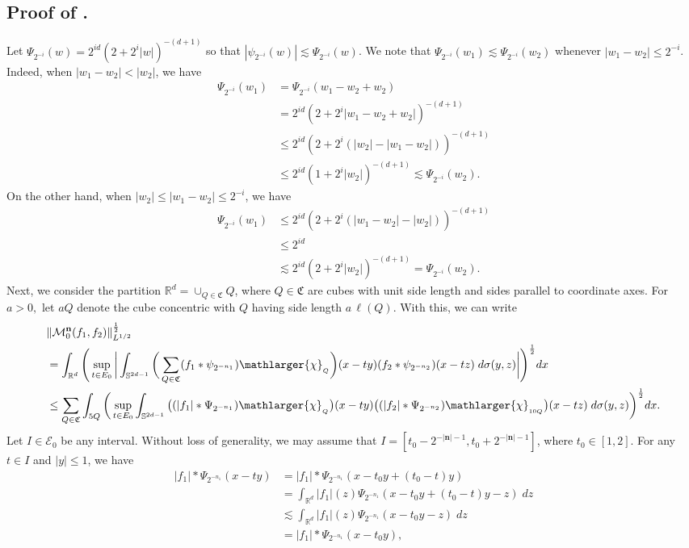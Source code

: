 \documentclass[a4paper,reqno]{amsart}
\numberwithin{equation}{section}
\newcommand{\R}{{\mathbb {R}}}
\begin{document}
	\subsection{Proof of .}
	Let $\Psi_{2^{-i}}(w)=2^{id}(2+2^i|w|)^{-(d+1)}$ so that $|\psi_{2^{-i}}(w)|\lesssim\Psi_{2^{-i}}(w)$. We note that $\Psi_{2^{-i}}(w_1)\lesssim\Psi_{2^{-i}}(w_2)$ whenever $|w_1-w_2|\leq2^{-i}$. Indeed, when $|w_1-w_2|<|w_2|$, we have
	\begin{align*}
		\Psi_{2^{-i}}(w_1)&=\Psi_{2^{-i}}(w_1-w_2+w_2)\\
		&=2^{id}(2+2^{i}|w_1-w_2+w_2|)^{-(d+1)}\\
		&\leq 2^{id}(2+2^{i}(|w_2|-|w_1-w_2|))^{-(d+1)}\\
		&\leq 2^{id}(1+2^{i}|w_2|)^{-(d+1)}\lesssim \Psi_{2^{-i}}(w_2).
	\end{align*}
	On the other hand, when $|w_2|\leq|w_1-w_2|\leq2^{-i}$, we have
	\begin{align*}
		\Psi_{2^{-i}}(w_1)&\leq 2^{id}(2+2^{i}(|w_1-w_2|-|w_2|))^{-(d+1)}\\
		&\leq 2^{id}\\
		&\lesssim 2^{id}(2+2^{i}|w_2|)^{-(d+1)}= \Psi_{2^{-i}}(w_2).
	\end{align*}
	Next, we consider the partition $\R^d=\cup_{Q\in\mathfrak C}Q$, where $Q\in\mathfrak{C}$ are cubes with unit side length and sides parallel to coordinate axes. For $a>0,$ let $aQ$ denote the cube concentric with $Q$ having side length $a\,\ell(Q)$. With this, we can write 
	\begin{align*}
		&\|\mathcal{M}^{\mathbf{n}}_0(f_1,f_2)\|_{L^{1/2}}^\frac{1}{2}\\	
		&=\int_{\R^d}\Bigg(\sup\limits_{t\in E_0}\bigg|\int_{\mathbb{S}^{2d-1}}\bigg(\sum\limits_{Q\in\mathfrak{C}}(f_1*\psi_{2^{-n_1}})\mathlarger{\chi}_{_Q}\bigg)(x-ty)( f_2*\psi_{2^{-n_2}})(x-tz)\;d\sigma(y,z)\bigg|\Bigg)^\frac{1}{2}dx\\
		&\leq\sum_{Q\in\mathfrak{C}}\int_{5Q}\bigg(\sup\limits_{t\in E_0}\int_{\mathbb{S}^{2d-1}}\big((|f_1|*\Psi_{2^{-n_1}})\mathlarger{\chi}_{_Q}\big)(x-ty)\big(( |f_2|*\Psi_{2^{-n_2}})\mathlarger{\chi}_{_{10Q}}\big)(x-tz)\;d\sigma(y,z)\bigg)^\frac{1}{2}dx.
	\end{align*}
	Let $I\in \mathcal{E}_0$ be any interval. Without loss of generality, we may assume  that $I=[t_0-2^{-|\mathbf{n}|-1},t_0+2^{-|\mathbf{n}|-1}]$, where $t_0\in [1,2]$. For any $t\in I$ and $|y|\leq1$, we have
	\begin{align*}
		|f_1|*\Psi_{2^{-n_1}}(x-ty)&=|f_1|*\Psi_{2^{-n_1}}(x-t_0y+(t_0-t)y)\\
		&=\int_{\R^d}|f_1|(z)\Psi_{2^{-n_1}}(x-t_0y+(t_0-t)y-z)\;dz\\
		&\lesssim \int_{\R^d}|f_1|(z)\Psi_{2^{-n_1}}(x-t_0y-z)\;dz\\
		&=|f_1|*\Psi_{2^{-n_1}}(x-t_0y),
	\end{align*}
\end{document}
